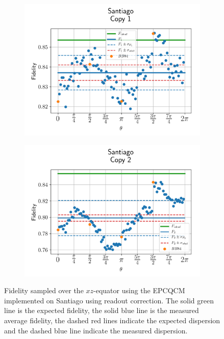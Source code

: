 \begin{figure}[H]
  \centering
  \begin{subfigure}{.5\textwidth}
    \centering
    \includegraphics[width=\textwidth]{Figures/Economical/IBM/OnlyEquator/results_santiago_copy1.png}
    \label{fig:epc_uncorrected_santiago_equator_1}
  \end{subfigure}%
  \begin{subfigure}{.5\textwidth}
    \centering
    \includegraphics[width=\textwidth]{Figures/Economical/IBM/OnlyEquator/results_santiago_copy2.png}
    \label{fig:epc_uncorrected_santiago_equator_2}
  \end{subfigure}
  \vspace{-0.5cm}
  \caption{Fidelity sampled over the $xz$-equator using the EPCQCM implemented on Santiago using readout correction. The solid green line is the expected fidelity, the solid blue line is the measured average fidelity, the dashed red lines indicate the expected dispersion and the dashed blue line indicate the measured dispersion.}
  \label{fig:epc_uncorrected_santiago_equator}
\end{figure}

